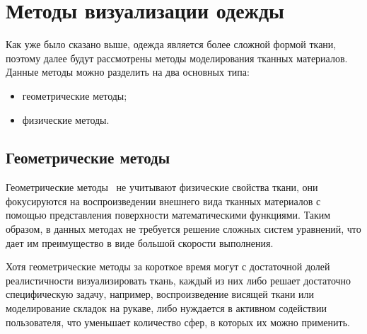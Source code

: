 \section{Методы визуализации одежды}

Как уже было сказано выше, одежда является более сложной формой ткани,
поэтому далее будут рассмотрены методы моделирования тканных материалов.
Данные методы можно разделить на два основных типа:
\begin{itemize}[left=\parindent]
    \item геометрические методы;
    \item физические методы.
\end{itemize}

\subsection{Геометрические методы}

Геометрические методы~\cite{bib07} не учитывают физические свойства ткани, они фокусируются
на воспроизведении внешнего вида тканных материалов с помощью представления
поверхности математическими функциями. Таким образом, в данных методах не
требуется решение сложных систем уравнений, что дает им преимущество в виде
большой скорости выполнения.

Хотя геометрические методы за короткое время могут с достаточной долей
реалистичности визуализировать ткань, каждый из них либо решает достаточно
специфическую задачу, например, воспроизведение висящей ткани или моделирование
складок на рукаве, либо нуждается в активном содействии пользователя, что
уменьшает количество сфер, в которых их можно применить.

